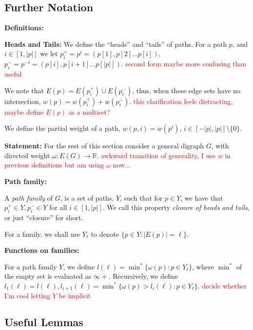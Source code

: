 \documentclass{article}
\theoremstyle{definition}
\newcommand{\edit}[1]{\textcolor{red}{#1}}
\newcommand{\rough}[1]{}%
\begin{document}
{\subsection{Further Notation} \label{notation}

\textbf{Definitions:}

\textbf{Heads and Tails:} We define the ``heads'' and ``tails'' of paths. For a path $p$, and $i \in [1,|p|]$ we let $p_i^+ = p^i = (p[1],p[2]\dots p[i])$, $p_i^- = p^{-i} = (p[i], p[i+1]\dots p[|p|])$.\edit{ second form maybe more confusing than useful}


We note that $E(p) = E(p_i^+)\cup E(p_i^-)$, thus, when these edge sets have no intersection, $w(p) = w(p_i^+)+w(p_i^-)$.\edit{ this clarification feels distracting, maybe define $E(p)$ as a multiset?}

We define the partial weight of a path, $w(p,i) = w(p^i)$, $i \in [-|p|,|p|] \setminus \{0\} $.

\vspace{1.75em}

\textbf{Statement:} For the rest of this section consider a general digraph $G$, with directed weight $\omega: E(G) \to \mathbb{R}$.\edit{ awkward transition of generality, I use $w$ in previous definitions but am using $\omega$ now...}

\vspace{1.75em}

\textbf{Path family:} 

A \textit{path family} of $G$, is a set of paths, $Y$, such that for $p \in Y$, we have that $p_i^+ \in Y,p_i^- \in Y$ for all $i \in [1,|p|]$. We call this property \textit{closure of heads and tails}, or just ``closure'' for short. 

For a family, we shall use $Y_\ell$ to denote $\{ p \in Y : |E(p)| = \ell\}$.

\vspace{1.75em}

\textbf{Functions on families:}

For a path family $Y$, we define $l(\ell) =  \min^*\{\omega(p): p \in Y_\ell\}$, where $\min^*$ of the empty set is evaluated as $\infty +$. Recursively, we define $l_1(\ell) = l(\ell), l_{i+1}(\ell) = \min^*\{ \omega(p) > l_i(\ell): p \in Y_\ell\}$.\edit{ decide whether I'm cool letting $Y$ be implicit}

\rough{NOT DONE WITH BELOW SECTION}

\subsection{Useful Lemmas} \label{lemmas}

}
\end{document}
